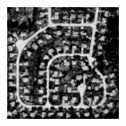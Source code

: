 \documentclass[usenames,dvipsnames,10pt]{beamer}
\begin{document}
\begin{frame}
\begin{minipage}[]{0.3\textwidth}
\includegraphics[width=\textwidth]{graphics/tfcn-output-02.jpg}
\end{minipage}
\end{frame}
\end{document}
